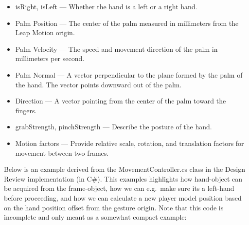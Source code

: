 \begin{itemize}
\item isRight, isLeft — Whether the hand is a left or a right hand.
\item Palm Position — The center of the palm measured in millimeters from the Leap Motion origin.
\item Palm Velocity — The speed and movement direction of the palm in millimeters per second.
\item Palm Normal — A vector perpendicular to the plane formed by the palm of the hand. The vector points downward out of the palm.
\item Direction — A vector pointing from the center of the palm toward the fingers.
\item grabStrength, pinchStrength — Describe the posture of the hand.
\item Motion factors — Provide relative scale, rotation, and translation factors for movement between two frames.
\end{itemize}

Below is an example derived from the MovementController.cs class in the Design Review implementation (in C\#). 
This examples highlights how hand-object can be acquired from the frame-object, how we can e.g.~make sure its a left-hand
before proceeding, and how we can calculate a new player model position based on the hand position offset from the gesture origin.
Note that this code is incomplete and only meant as a somewhat compact example:

